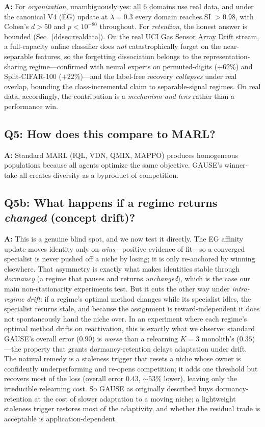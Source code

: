 \documentclass[11pt,a4paper]{article}
\theoremstyle{definition}
\theoremstyle{plain}
\begin{document}
\textbf{A:} For \emph{organization}, unambiguously yes: all 6 domains use real data,
and under the canonical V4 (EG) update at $\lambda=0.3$ every domain reaches SI
$>0.98$, with Cohen's $d>50$ and $p<10^{-80}$ throughout. For \emph{retention}, the
honest answer is bounded (Sec.~\ref{ddsec:realdata}). On the real UCI Gas Sensor
Array Drift stream, a full-capacity online classifier does \emph{not} catastrophically
forget on the near-separable features, so the forgetting dissociation belongs to the
representation-sharing regime---confirmed with neural experts on permuted-digits
($+62\%$) and Split-CIFAR-100 ($+22\%$)---and the label-free recovery \emph{collapses}
under real overlap, bounding the class-incremental claim to separable-signal regimes.
On real data, accordingly, the contribution is a \emph{mechanism and lens} rather than
a performance win.

\subsection{Q5: How does this compare to MARL?}

\textbf{A:} Standard MARL (IQL, VDN, QMIX, MAPPO) produces homogeneous populations because all agents optimize the same objective. GAUSE's winner-take-all creates diversity as a byproduct of competition.

\subsection{Q5b: What happens if a regime returns \emph{changed} (concept drift)?}

\textbf{A:} This is a genuine blind spot, and we now test it directly. The EG affinity
update moves identity only on \emph{wins}---positive evidence of fit---so a converged
specialist is never pushed off a niche by losing; it is only re-anchored by winning
elsewhere. That asymmetry is exactly what makes identities stable through
\emph{dormancy} (a regime that pauses and returns \emph{unchanged}), which is the
case our main non-stationarity experiments test. But it cuts the other way under
\emph{intra-regime drift}: if a regime's optimal method changes while its specialist
idles, the specialist returns stale, and because the assignment is
reward-independent it does not spontaneously hand the niche over. In an experiment
where each regime's optimal method drifts on reactivation, this is exactly what we
observe: standard GAUSE's overall error ($0.90$) is \emph{worse} than a relearning
$K{=}3$ monolith's ($0.35$)---the property that grants dormancy-retention delays
adaptation under drift. The natural remedy is a staleness trigger that resets a niche
whose owner is confidently underperforming and re-opens competition; it adds one
threshold but recovers most of the loss (overall error $0.43$, $\sim53\%$ lower),
leaving only the irreducible relearning cost. So GAUSE as originally described buys
dormancy-retention at the cost of slower adaptation to a moving niche; a lightweight
staleness trigger restores most of the adaptivity, and whether the residual trade is
acceptable is application-dependent.
\end{document}

